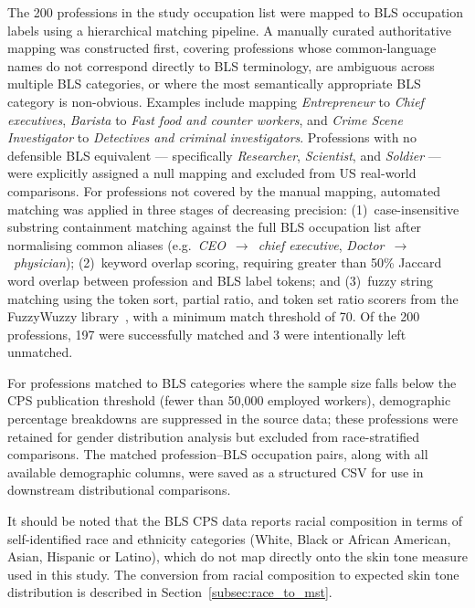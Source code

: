 The 200 professions in the study occupation list were mapped to BLS occupation labels
using a hierarchical matching pipeline. A manually curated authoritative mapping was
constructed first, covering professions whose common-language names do not correspond
directly to BLS terminology, are ambiguous across multiple BLS categories, or where the
most semantically appropriate BLS category is non-obvious. Examples include mapping
\textit{Entrepreneur} to \textit{Chief executives}, \textit{Barista} to \textit{Fast
	food and counter workers}, and \textit{Crime Scene Investigator} to \textit{Detectives
	and criminal investigators}. Professions with no defensible BLS equivalent ---
specifically \textit{Researcher}, \textit{Scientist}, and \textit{Soldier} --- were
explicitly assigned a null mapping and excluded from US real-world comparisons. For
professions not covered by the manual mapping, automated matching was applied in three
stages of decreasing precision: (1)~case-insensitive substring containment matching
against the full BLS occupation list after normalising common aliases
(e.g.\ \textit{CEO}~$\rightarrow$~\textit{chief executive},
\textit{Doctor}~$\rightarrow$~\textit{physician}); (2)~keyword overlap scoring,
requiring greater than 50\% Jaccard word overlap between profession and BLS label
tokens; and (3)~fuzzy string matching using the token sort, partial ratio, and token
set ratio scorers from the FuzzyWuzzy library~\cite{fuzzywuzzy}, with a minimum match
threshold of 70. Of the 200 professions, 197 were successfully matched and 3 were
intentionally left unmatched.

For professions matched to BLS categories where the sample size falls below the CPS
publication threshold (fewer than 50,000 employed workers), demographic percentage
breakdowns are suppressed in the source data; these professions were retained for gender
distribution analysis but excluded from race-stratified comparisons. The matched
profession--BLS occupation pairs, along with all available demographic columns, were
saved as a structured CSV for use in downstream distributional comparisons.

It should be noted that the BLS CPS data reports racial composition in terms of
self-identified race and ethnicity categories (White, Black or African American, Asian,
Hispanic or Latino), which do not map directly onto the skin tone measure used in this
study. The conversion from racial composition to expected skin tone distribution is
described in Section~\ref{subsec:race_to_mst}.

